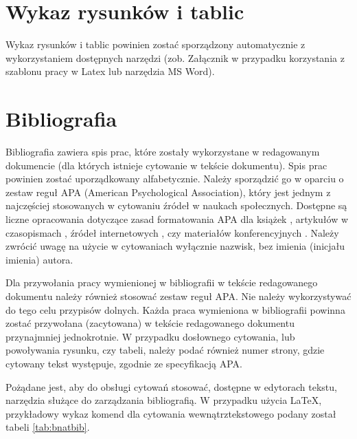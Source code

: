 \section{Wykaz rysunków i tablic}
Wykaz rysunków i tablic powinien zostać sporządzony automatycznie z wykorzystaniem dostępnych narzędzi (zob. Załącznik w przypadku korzystania z szablonu pracy w Latex lub narzędzia MS Word).


\section{Bibliografia}

Bibliografia zawiera spis prac, które zostały wykorzystane w redagowanym dokumencie (dla których istnieje cytowanie w tekście dokumentu). Spis prac powinien zostać uporządkowany alfabetycznie. Należy sporządzić go w oparciu o zestaw reguł APA (American Psychological Association), który jest jednym z najczęściej stosowanych w cytowaniu źródeł w naukach społecznych. Dostępne są liczne opracowania dotyczące zasad formatowania APA \citep{website:apa} dla książek \citep{weglinska}, artykułów w czasopismach \citep{barczak-brezinski}, źródeł internetowych \citep{website:paragraph}, czy materiałów konferencyjnych \citep{saltz2019exploring}. Należy zwrócić uwagę na użycie w cytowaniach wyłącznie nazwisk, bez imienia (inicjału imienia) autora.

Dla przywołania pracy wymienionej w bibliografii w tekście redagowanego dokumentu należy również stosować zestaw reguł APA. Nie należy wykorzystywać do tego celu przypisów dolnych. Każda praca wymieniona w bibliografii powinna zostać przywołana (zacytowana) w tekście redagowanego dokumentu przynajmniej jednokrotnie. W przypadku dosłownego cytowania, lub powoływania rysunku, czy tabeli, należy podać również numer strony, gdzie cytowany tekst występuje, zgodnie ze specyfikacją APA\footnotemark.


Pożądane jest, aby do obsługi cytowań stosować, dostępne w edytorach tekstu, narzędzia służące do zarządzania bibliografią. W przypadku użycia \LaTeX, przykładowy wykaz komend dla cytowania wewnątrztekstowego podany został tabeli \ref{tab:bnatbib}. 


